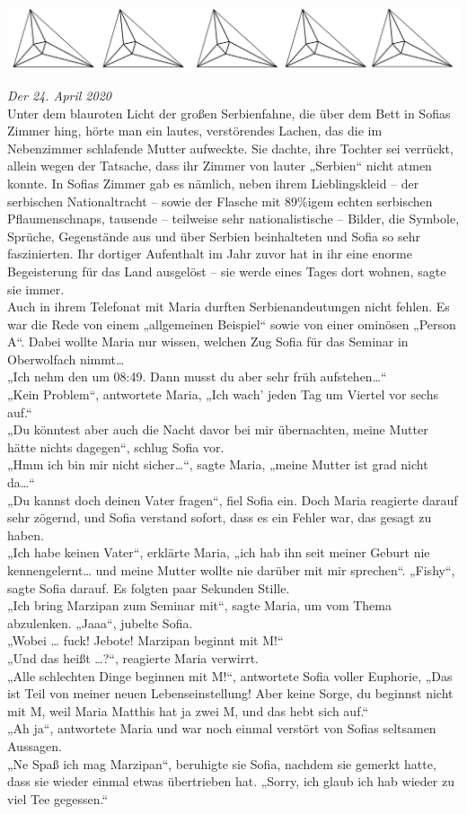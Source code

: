 \documentclass[oneside]{memoir}
\newcommand{\parasep}{
\bigskip
\bigskip
\begin{center} 
   \includegraphics[scale=.08]{parasep5.jpg} 
\end{center}
\bigskip
\bigskip
}
\begin{document}
     \parasep
     \textit{Der 24. April 2020} \\ 
     
     Unter dem blauroten Licht der großen Serbienfahne, die über dem Bett in Sofias Zimmer hing, hörte man ein lautes, verstörendes Lachen, das die im Nebenzimmer schlafende Mutter aufweckte. Sie dachte, ihre Tochter sei verrückt, allein wegen der Tatsache, dass ihr Zimmer von lauter „Serbien“ nicht atmen konnte. In Sofias Zimmer gab es nämlich, neben ihrem Lieblingskleid -- der serbischen Nationaltracht -- sowie der Flasche mit 89\%igem echten serbischen Pflaumenschnaps, tausende -- teilweise sehr nationalistische -- Bilder, die Symbole, Sprüche, Gegenstände aus und über Serbien beinhalteten und Sofia so sehr faszinierten. Ihr dortiger Aufenthalt im Jahr zuvor hat in ihr eine enorme Begeisterung für das Land ausgelöst -- sie werde eines Tages dort wohnen, sagte sie immer. \\
Auch in ihrem Telefonat mit Maria durften Serbienandeutungen nicht fehlen. Es war die Rede von einem „allgemeinen Beispiel“ sowie von einer ominösen „Person A“. Dabei wollte Maria nur wissen, welchen Zug Sofia für das Seminar in Oberwolfach nimmt\ldots \\ 
„Ich nehm den um 08:49. Dann musst du aber sehr früh aufstehen\ldots“  \\ 
„Kein Problem“, antwortete Maria, „Ich wach' jeden Tag um Viertel vor sechs auf.“ \\  
„Du könntest aber auch die Nacht davor bei mir übernachten, meine Mutter hätte nichts dagegen“, schlug Sofia vor.  \\ 
„Hmm ich bin mir nicht sicher\ldots“, sagte Maria, „meine Mutter ist grad nicht da\ldots“  \\ 
„Du kannst doch deinen Vater fragen“, fiel Sofia ein. 
Doch Maria reagierte darauf sehr zögernd, und Sofia verstand sofort, dass es ein Fehler war, das gesagt zu haben. \\ 
„Ich habe keinen Vater“, erklärte Maria, „ich hab ihn seit meiner Geburt nie kennengelernt\ldots{} und meine Mutter wollte nie darüber mit mir sprechen“.
„Fishy“, sagte Sofia darauf. 
Es folgten paar Sekunden Stille. 
 \\ 
„Ich bring Marzipan zum Seminar mit“,  sagte Maria, um vom Thema abzulenken. 
„Jaaa“, jubelte Sofia.  \\ 
„Wobei \ldots{} fuck! Jebote! Marzipan beginnt mit M!“  \\ 
„Und das heißt \ldots?“, reagierte Maria verwirrt.  \\ 
„Alle schlechten Dinge beginnen mit M!“, antwortete Sofia voller Euphorie, „Das ist Teil von meiner neuen Lebenseinstellung! Aber keine Sorge, du beginnst nicht mit M, weil Maria Matthis hat ja zwei M, und das hebt sich auf.“  \\ 
„Ah ja“, antwortete Maria und war noch einmal verstört von Sofias seltsamen Aussagen.  \\ 
„Ne Spaß ich mag Marzipan“, beruhigte sie Sofia, nachdem sie gemerkt hatte, dass sie wieder einmal etwas übertrieben hat.
„Sorry, ich glaub ich hab wieder zu viel Tee gegessen.“
\end{document}
